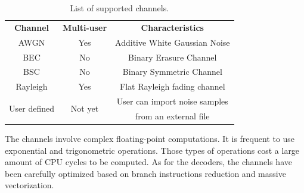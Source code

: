 \begin{table}
  \centering
  \caption{List of supported channels.}
  \label{tab:lib_channels}
  \begin{tabular}{ c | c | c }
  \multirow{2}{*}{\textbf{Channel}}      & \multirow{2}{*}{\textbf{Multi-user}} & \multirow{2}{*}{\textbf{Characteristics}}      \\
                                         &                                      &                                                \\
  \hline
  \hline
  \multirow{2}{*}{{AWGN}}                & \multirow{2}{*}{Yes}                 & \multirow{2}{*}{Additive White Gaussian Noise} \\
                                         &                                      &                                                \\
  \hline
  \multirow{2}{*}{{BEC}}                 & \multirow{2}{*}{No}                  & \multirow{2}{*}{Binary Erasure Channel}        \\
                                         &                                      &                                                \\
  \hline
  \multirow{2}{*}{{BSC}}                 & \multirow{2}{*}{No}                  & \multirow{2}{*}{Binary Symmetric Channel}      \\
                                         &                                      &                                                \\
  \hline
  \multirow{2}{*}{{Rayleigh}}            & \multirow{2}{*}{Yes}                 & \multirow{2}{*}{Flat Rayleigh fading channel}  \\
                                         &                                      &                                                \\
  \hline
  \multirow{2}{*}{{User defined}}        & \multirow{2}{*}{Not yet}             & User can import noise samples                  \\
                                         &                                      & from an external file                          \\
  \end{tabular}
\end{table}

The channels involve complex floating-point computations. It is frequent to use
exponential and trigonometric operations. Those types of operations cost a large
amount of CPU cycles to be computed. As for the decoders, the channels have been
carefully optimized based on branch instructions reduction and massive
vectorization.

